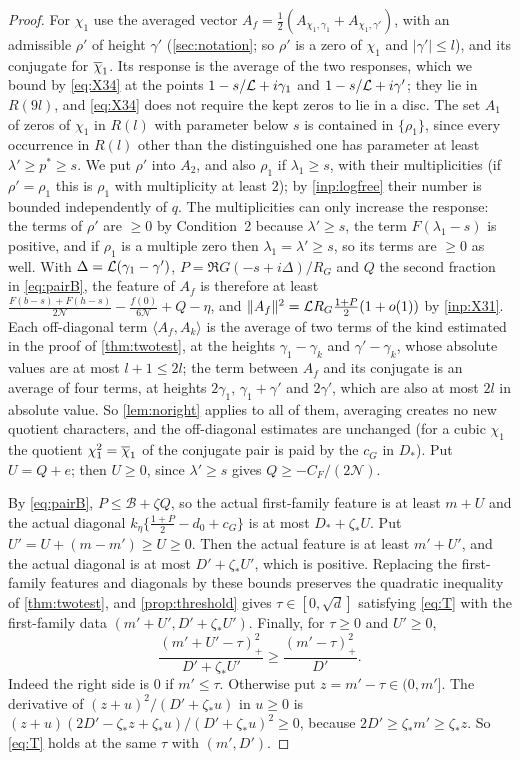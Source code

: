 \begin{proof}
For $\chi_1$ use the averaged vector $A_f=\frac12(A_{\chi_1,\gamma_1}+A_{\chi_1,\gamma'})$, with an admissible $\rho'$ of height
$\gamma'$ (\cref{sec:notation}; so $\rho'$ is a zero of $\chi_1$ and $|\gamma'|\le l$), and its conjugate for $\overline{\chi}_1$. Its
response is the average of the two responses, which we bound by \eqref{eq:X34} at the points
$1-s/\mathcal{L}+i\gamma_1$ and $1-s/\mathcal{L}+i\gamma'$; they lie in $R(9l)$, and \eqref{eq:X34} does not require the kept zeros
to lie in a disc. The set $A_1$ of zeros of $\chi_1$ in $R(l)$ with parameter below $s$ is contained in
$\{\rho_1\}$, since every occurrence in $R(l)$ other than the distinguished one has parameter at least
$\lambda'\ge p^*\ge s$. We put $\rho'$ into $A_2$, and also $\rho_1$ if $\lambda_1\ge s$, with their multiplicities (if
$\rho'=\rho_1$ this is $\rho_1$ with multiplicity at least $2$); by \cref{inp:logfree} their number is bounded
independently of $q$. The multiplicities can only increase the response: the terms of $\rho'$ are
$\ge0$ by Condition~2 because $\lambda'\ge s$, the term $F(\lambda_1-s)$ is positive, and if $\rho_1$ is a multiple
zero then $\lambda_1=\lambda'\ge s$, so its terms are $\ge0$ as well. With $\Delta=\mathcal{L}(\gamma_1-\gamma')$, $P=\Re G(-s+i\Delta)/R_G$ and $Q$ the second
fraction in \eqref{eq:pairB}, the feature of $A_f$ is therefore at least
$\frac{F(b-s)+F(h-s)}{2\mathcal N}-\frac{f(0)}{6\mathcal N}+Q-\eta$, and $\|A_f\|^2=\mathcal{L} R_G\frac{1+P}2(1+o(1))$ by \cref{inp:X31}. Each
off-diagonal term $\langle A_f,A_k\rangle$ is the average of two terms of the kind estimated in the proof of
\cref{thm:twotest}, at the heights $\gamma_1-\gamma_k$ and $\gamma'-\gamma_k$, whose absolute values are at most
$l+1\le2l$; the term between $A_f$ and its conjugate is an average of four terms, at heights
$2\gamma_1$, $\gamma_1+\gamma'$ and $2\gamma'$, which are also at most $2l$ in absolute value. So \cref{lem:noright}
applies to all of them, averaging creates no new quotient characters, and the off-diagonal estimates
are unchanged (for a cubic $\chi_1$ the quotient $\chi_1^2=\overline{\chi}_1$ of the conjugate pair is paid by the $c_G$
in $D_*$). Put $U=Q+e$; then $U\ge0$, since $\lambda'\ge s$ gives
$Q\ge-C_F/(2\mathcal N)$.

By \eqref{eq:pairB}, $P\le\mathcal B+\zeta Q$, so the actual first-family feature is at least $m+U$ and the
actual diagonal $k_\eta\{\frac{1+P}2-d_0+c_G\}$ is at most $D_*+\zeta_*U$. Put $U'=U+(m-m')\ge U\ge0$. Then the actual
feature is at least $m'+U'$, and the actual diagonal is at most $D'+\zeta_*U'$, which is positive.
Replacing the first-family features and diagonals by these bounds preserves the quadratic
inequality of \cref{thm:twotest}, and \cref{prop:threshold} gives $\tau\in[0,\sqrt d]$ satisfying \eqref{eq:T}
with the first-family data $(m'+U',D'+\zeta_*U')$. Finally, for $\tau\ge0$ and $U'\ge0$,
\[
  \frac{(m'+U'-\tau)_+^2}{D'+\zeta_*U'}\ge\frac{(m'-\tau)_+^2}{D'} .
\]
Indeed the right side is $0$ if $m'\le\tau$. Otherwise put $z=m'-\tau\in(0,m']$. The derivative of
$(z+u)^2/(D'+\zeta_*u)$ in $u\ge0$ is $(z+u)(2D'-\zeta_*z+\zeta_*u)/(D'+\zeta_*u)^2\ge0$, because
$2D'\ge\zeta_*m'\ge\zeta_*z$. So \eqref{eq:T} holds at the same $\tau$ with $(m',D')$.
\end{proof}

